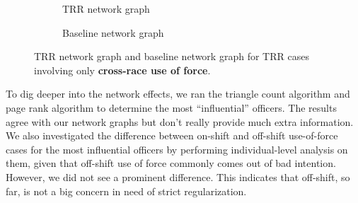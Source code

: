 \documentclass[10pt]{article}
\begin{document}
\begin{figure}[H]
\centering
\captionsetup{font=small}
    \begin{subfigure}{0.5\textwidth}
        \caption{TRR network graph}
        \label{trr_cross_race}
    \end{subfigure}%
    \begin{subfigure}{0.5\textwidth}
        \caption{Baseline network graph}
        \label{baseline_cross_race}
    \end{subfigure}
\caption{TRR network graph and baseline network graph for TRR cases involving only \textbf{cross-race use of force}.}
\end{figure}

To dig deeper into the network effects, we ran the triangle count algorithm and page rank algorithm to determine the most “influential” officers. The results agree with our network graphs but don’t really provide much extra information. We also investigated the difference between on-shift and off-shift use-of-force cases for the most influential officers by performing individual-level analysis on them, given that off-shift use of force commonly comes out of bad intention. However, we did not see a prominent difference. This indicates that off-shift, so far, is not a big concern in need of strict regularization.
\end{document}
